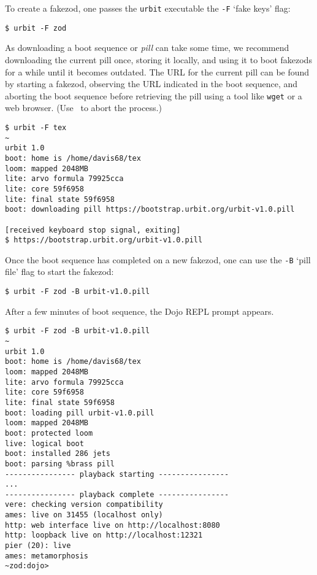 {{{{To create a fakezod, one passes the \texttt{urbit} executable the \texttt{-F} ‘fake keys’ flag:

\lstset{language=bash}
\begin{lstlisting}[style=nonumbers]
$ urbit -F zod
\end{lstlisting}

As downloading a boot sequence or \emph{pill} can take some time, we recommend downloading the current pill once, storing it locally, and using it to boot fakezods for a while until it becomes outdated.  The URL for the current pill can be found by starting a fakezod, observing the URL indicated in the boot sequence, and aborting the boot sequence before retrieving the pill using a tool like \texttt{wget} or a web browser.  (Use \CtrlZ~to abort the process.)

\begin{lstlisting}[style=nonumbers]
$ urbit -F tex
~
urbit 1.0
boot: home is /home/davis68/tex
loom: mapped 2048MB
lite: arvo formula 79925cca
lite: core 59f6958
lite: final state 59f6958
boot: downloading pill https://bootstrap.urbit.org/urbit-v1.0.pill

[received keyboard stop signal, exiting]
$ https://bootstrap.urbit.org/urbit-v1.0.pill
\end{lstlisting}

Once the boot sequence has completed on a new fakezod, one can use the \texttt{-B} ‘pill file’ flag to start the fakezod:

\begin{lstlisting}[style=nonumbers]
$ urbit -F zod -B urbit-v1.0.pill
\end{lstlisting}

After a few minutes of boot sequence, the Dojo REPL prompt appears.

\begin{lstlisting}[style=nonumbers]
$ urbit -F zod -B urbit-v1.0.pill
~
urbit 1.0
boot: home is /home/davis68/tex
loom: mapped 2048MB
lite: arvo formula 79925cca
lite: core 59f6958
lite: final state 59f6958
boot: loading pill urbit-v1.0.pill
loom: mapped 2048MB
boot: protected loom
live: logical boot
boot: installed 286 jets
boot: parsing %brass pill
---------------- playback starting ----------------
...
---------------- playback complete ----------------
vere: checking version compatibility
ames: live on 31455 (localhost only)
http: web interface live on http://localhost:8080
http: loopback live on http://localhost:12321
pier (20): live
ames: metamorphosis
~zod:dojo>
\end{lstlisting}

}}}}
